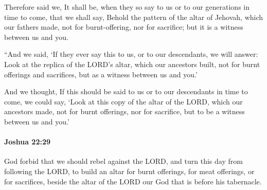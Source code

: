 			\begin{versebox}
					\item[BHS] 
					\item[ASV] Therefore said we, It shall be, when they so say to us or to our generations in time to come, that we shall say, Behold the pattern of the altar of Jehovah, which our fathers made, not for burnt-offering, nor for sacrifice; but it is a witness between us and you.
					\item[NIV] “And we said, ‘If they ever say this to us, or to our descendants, we will answer: Look at the replica of the LORD’s altar, which our ancestors built, not for burnt offerings and sacrifices, but as a witness between us and you.’
					\item[NRSV] And we thought, If this should be said to us or to our descendants in time to come, we could say, ‘Look at this copy of the altar of the LORD, which our ancestors made, not for burnt offerings, nor for sacrifice, but to be a witness between us and you.’
			\end{versebox}

		\paragraph{Joshua 22:29} %
			\label{JOSHUA-22-29}

			God forbid that we should rebel against the LORD, and turn this day from following the LORD, to build an altar for burnt offerings, for meat offerings, or for sacrifices, beside the altar of the LORD our God that is before his tabernacle.

